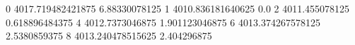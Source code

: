 0 4017.719482421875 6.88330078125
1 4010.836181640625 0.0
2 4011.455078125 0.618896484375
4 4012.7373046875 1.901123046875
6 4013.374267578125 2.5380859375
8 4013.240478515625 2.404296875
